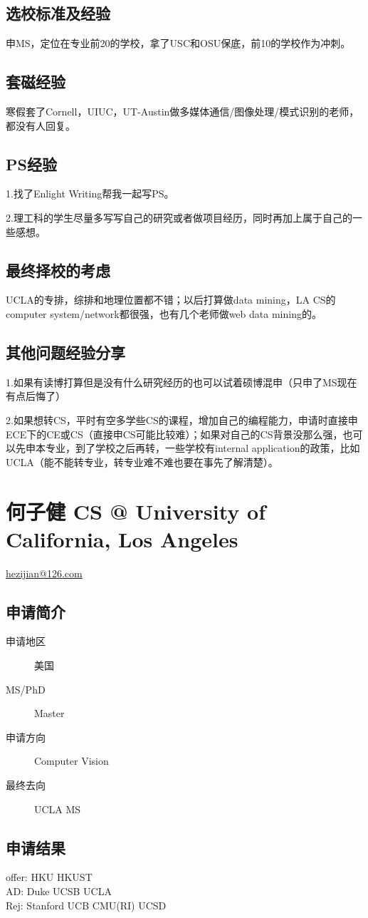 \documentclass[11pt,fleqn,openany]{book} %
\begin{document}
\subsection*{选校标准及经验}
申MS，定位在专业前20的学校，拿了USC和OSU保底，前10的学校作为冲刺。
\subsection*{套磁经验}
寒假套了Cornell，UIUC，UT-Austin做多媒体通信/图像处理/模式识别的老师，都没有人回复。
\subsection*{PS经验}
1.找了Enlight Writing帮我一起写PS。

2.理工科的学生尽量多写写自己的研究或者做项目经历，同时再加上属于自己的一些感想。
\subsection*{最终择校的考虑}
UCLA的专排，综排和地理位置都不错；以后打算做data mining，LA CS的computer system/network都很强，也有几个老师做web data mining的。
\subsection*{其他问题经验分享}
1.如果有读博打算但是没有什么研究经历的也可以试着硕博混申（只申了MS现在有点后悔了）

2.如果想转CS，平时有空多学些CS的课程，增加自己的编程能力，申请时直接申ECE下的CE或CS（直接申CS可能比较难）；如果对自己的CS背景没那么强，也可以先申本专业，到了学校之后再转，一些学校有internal application的政策，比如UCLA（能不能转专业，转专业难不难也要在事先了解清楚）。
\clearpage
\section{何子健 CS @ University of California, Los Angeles}
\hfill \href{mailto:hezijian@126.com}{hezijian@126.com}

\noindent\begin{minipage}[t]{0.45\textwidth}
\subsection*{申请简介}
\begin{description}
\item[申请地区] 美国
\item[MS/PhD] Master
\item[申请方向] Computer Vision
\item[最终去向] UCLA MS
\end{description}
\end{minipage}
\hfill
\begin{minipage}[t]{0.45\textwidth}
\subsection*{申请结果}
\noindent offer: HKU HKUST\\
AD: Duke UCSB UCLA\\
Rej: Stanford UCB CMU(RI) UCSD
\end{minipage}
\end{document}
